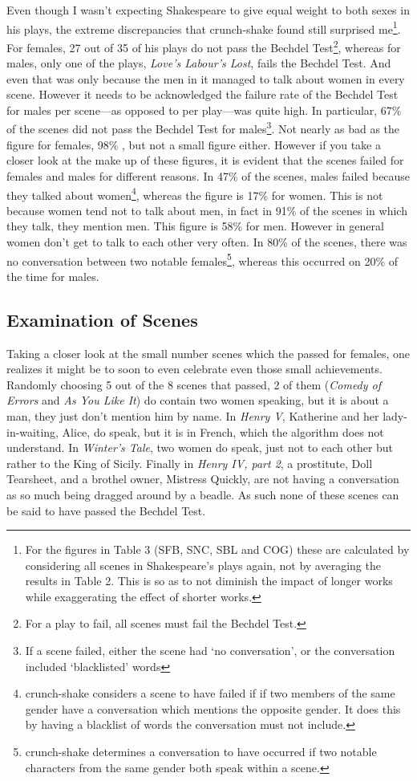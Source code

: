 \documentclass[12pt]{article}
\begin{document}
Even though I wasn't expecting Shakespeare to give equal weight to both sexes
in his plays, the extreme discrepancies that crunch-shake found still surprised
me\footnote{For the figures in Table 3 (SFB, SNC, SBL and COG) these are
calculated by considering all scenes in Shakespeare's plays again, not by
averaging the results in Table 2. This is so as to not diminish the impact of
longer works while exaggerating the effect of shorter works.}. For females, 27
out of 35 of his plays do not pass the Bechdel Test\footnote{For a play to
fail, all scenes must fail the Bechdel Test.}, whereas for males, only one of
the plays, \emph{Love's Labour's Lost}, fails the Bechdel Test.  And even that
was only because the men in it managed to talk about women in every scene.
However it needs to be acknowledged the failure rate of the Bechdel Test for
males per scene---as opposed to per play---was quite high. In particular, 67\%
of the scenes did not pass the Bechdel Test for males\footnote{If a scene
failed, either the scene had `no conversation', or the conversation included
`blacklisted' words}.  Not nearly as bad as the figure for females, 98\% , but
not a small figure either. However if you take a closer look at the make up of
these figures, it is evident that the scenes failed for females and males for
different reasons.  In 47\% of the scenes, males failed because they talked
about women\footnote{crunch-shake considers a scene to have failed if if two
members of the same gender have a conversation which mentions the opposite
gender. It does this by having a blacklist of words the conversation must not
include.}, whereas the figure is 17\% for women. This is not because women tend
not to talk about men, in fact in 91\% of the scenes in which they talk, they
mention men. This figure is 58\% for men.  However in general women don't get
to talk to each other very often. In 80\% of the scenes, there was no
conversation between two notable females\footnote{crunch-shake determines a
conversation to have occurred if two notable characters from the same gender
both speak within a scene.}, whereas this occurred on 20\% of the time for
males. 

\subsection{Examination of Scenes}
\label{sub:examination_of_scenes}

Taking a closer look at the small number scenes which the passed for females,
one realizes it might be to soon to even celebrate even those small
achievements.  Randomly choosing 5 out of the 8 scenes that passed, 2 of them
(\emph{Comedy of Errors} and \emph{As You Like It}) do contain two women
speaking, but it is about a man, they just don't mention him by name. In
\emph{Henry V}, Katherine and her lady-in-waiting, Alice, do speak, but it is
in French, which the algorithm does not understand. In \emph{Winter's Tale},
two women do speak, just not to each other but rather to the King of Sicily.
Finally in \emph{Henry IV, part 2}, a prostitute, Doll Tearsheet, and a brothel
owner, Mistress Quickly, are not having a conversation as so much being dragged
around by a beadle. As such none of these scenes can be said to have passed the
Bechdel Test.
\end{document}

